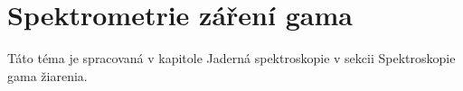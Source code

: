 \documentclass[../../main.tex]{subfiles}
\begin{document}
\section{Spektrometrie záření gama}

Táto téma je spracovaná v kapitole Jaderná spektroskopie v sekcii Spektroskopie gama žiarenia.
\end{document}
